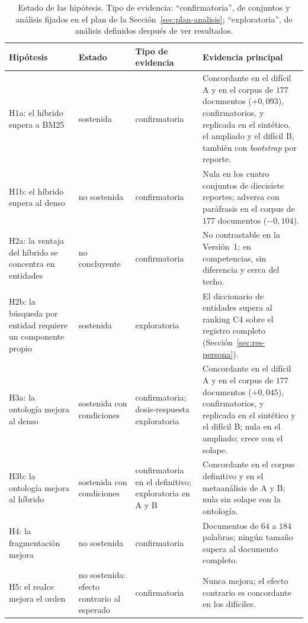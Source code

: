 \documentclass[11pt,letterpaper]{article}
\numberwithin{equation}{section}
\begin{document}
\begin{table}[htbp]
\centering
\footnotesize
\setlength{\tabcolsep}{4pt}
\renewcommand{\arraystretch}{1.3}
\caption{Estado de las hipótesis. Tipo de evidencia: ``confirmatoria'', de conjuntos y análisis fijados en el plan de la Sección~\ref{sec:plan-analisis}; ``exploratoria'', de análisis definidos después de ver resultados.}
\label{tab:hipotesis}
\begin{tabularx}{\textwidth}{@{}>{\raggedright\arraybackslash}p{3.6cm} >{\raggedright\arraybackslash}p{2.5cm} >{\raggedright\arraybackslash}p{2.2cm} Y@{}}
\toprule
\textbf{Hipótesis} & \textbf{Estado} & \textbf{Tipo de evidencia} & \textbf{Evidencia principal} \\
\midrule
H1a: el híbrido supera a BM25 & sostenida & confirmatoria & Concordante en el difícil A y en el corpus de $177$ documentos ($+0{,}093$), confirmatorios, y replicada en el sintético, el ampliado y el difícil B, también con \textit{bootstrap} por reporte. \\
H1b: el híbrido supera al denso & no sostenida & confirmatoria & Nula en los cuatro conjuntos de diecisiete reportes; adversa con paráfrasis en el corpus de $177$ documentos ($-0{,}104$). \\
H2a: la ventaja del híbrido se concentra en entidades & no concluyente & confirmatoria & No contrastable en la Versión~1; en competencias, sin diferencia y cerca del techo. \\
H2b: la búsqueda por entidad requiere un componente propio & sostenida & exploratoria & El diccionario de entidades supera al ranking C4 sobre el registro completo (Sección~\ref{sec:res-persona}). \\
H3a: la ontología mejora al denso & sostenida con condiciones & confirmatoria; dosis-respuesta exploratoria & Concordante en el difícil A y en el corpus de $177$ documentos ($+0{,}045$), confirmatorios, y replicada en el sintético y el difícil B; nula en el ampliado; crece con el solape. \\
H3b: la ontología mejora al híbrido & sostenida con condiciones & confirmatoria en el definitivo; exploratoria en A y B & Concordante en el corpus definitivo y en el metaanálisis de A y B; nula sin solape con la ontología. \\
H4: la fragmentación mejora & no sostenida & confirmatoria & Documentos de $64$ a $184$ palabras; ningún tamaño supera al documento completo. \\
H5: el realce mejora el orden & no sostenida: efecto contrario al esperado & confirmatoria & Nunca mejora; el efecto contrario es concordante en los difíciles. \\

\end{tabularx}
\end{table}
\end{document}
